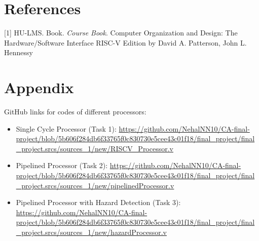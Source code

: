 \documentclass{report}
\begin{document}
\chapter{References}

[1] HU-LMS. Book. \textit{Course Book}. Computer Organization and Design: The Hardware/Software Interface RISC-V Edition by David A. Patterson, John L. Hennessy

\appendix
\chapter{Appendix}

GitHub links for codes of different processors: 
\begin{itemize}
    \item Single Cycle Processor (Task 1): \url{https://github.com/NehalNN10/CA-final-project/blob/5b606f284db6f33765f0c830730e5cee43c01f18/final_project/final_project.srcs/sources_1/new/RISCV_Processor.v}
    \item Pipelined Processor (Task 2): \url{https://github.com/NehalNN10/CA-final-project/blob/5b606f284db6f33765f0c830730e5cee43c01f18/final_project/final_project.srcs/sources_1/new/pipelinedProcessor.v}
    \item Pipelined Processor with Hazard Detection (Task 3): \url{https://github.com/NehalNN10/CA-final-project/blob/5b606f284db6f33765f0c830730e5cee43c01f18/final_project/final_project.srcs/sources_1/new/hazardProcessor.v}
\end{itemize}
\end{document}
